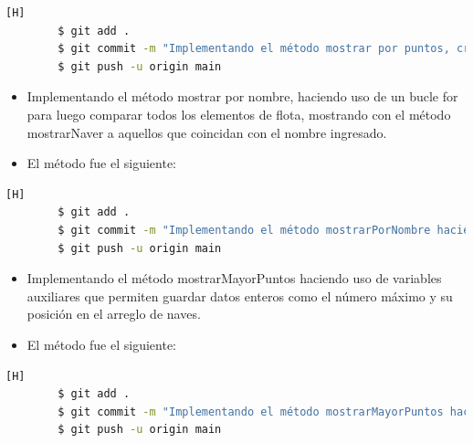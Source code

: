 \documentclass{article}
\begin{document}
    \begin{lstlisting}[language=bash,caption={Commit: Implementando el método mostrar por puntos, creando un nuevo método para mostrar naves (mostrarNave)}][H]
		$ git add .
		$ git commit -m "Implementando el método mostrar por puntos, creando un nuevo método para mostrar naves (mostrarNave)"			
		$ git push -u origin main
    \end{lstlisting}

    
    \begin{itemize}	
        \item Implementando el método mostrar por nombre, haciendo uso de un bucle for para luego comparar todos los elementos de flota, mostrando con el método mostrarNaver a aquellos que coincidan con el nombre ingresado.
	\item El método fue el siguiente:
    \end{itemize}
    

    \begin{lstlisting}[language=bash,caption={Commit: Implementando el metodo mostrarPorNombre haciendo uso de un bucle for y el método mostrarNave}][H]
		$ git add .
		$ git commit -m "Implementando el método mostrarPorNombre haciendo uso de un bucle for y el metodo mostrarNave"
		$ git push -u origin main
    \end{lstlisting}
    

    \begin{itemize}	
        \item Implementando el método mostrarMayorPuntos haciendo uso de variables auxiliares que permiten guardar datos enteros como el número máximo y su posición en el arreglo de naves.
	\item El método fue el siguiente:
    \end{itemize}
    

    \begin{lstlisting}[language=bash,caption={Commit: Implementando el método mostrarMayorPuntos haciendo uso de variables auxiliares para guardar valores de puntaje y posición}][H]
		$ git add .
		$ git commit -m "Implementando el método mostrarMayorPuntos haciendo uso de variables auxiliares para guardar valores de puntaje y posición"
		$ git push -u origin main
    \end{lstlisting}
\end{document}
